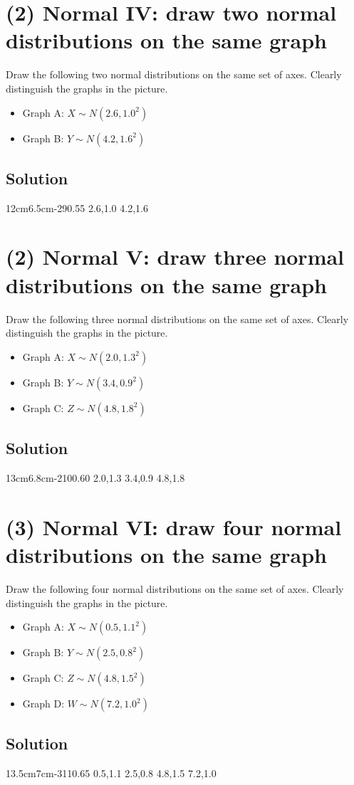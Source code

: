 \section{(2) Normal IV: draw two normal distributions on the same graph}
Draw the following two normal distributions on the same set of axes. Clearly distinguish the graphs in the picture.
\begin{itemize}
\item Graph A: $X\sim N(2.6,1.0^2)$
\item Graph B: $Y\sim N(4.2,1.6^2)$
\end{itemize}
\subsection*{Solution}
\NormalTwoGraph
{12cm}{6.5cm}{-2}{9}{0.55}
{2.6,1.0}
{4.2,1.6}

\section{(2) Normal V: draw three normal distributions on the same graph}
Draw the following three normal distributions on the same set of axes. Clearly distinguish the graphs in the picture.
\begin{itemize}
\item Graph A: $X\sim N(2.0,1.3^2)$
\item Graph B: $Y\sim N(3.4,0.9^2)$
\item Graph C: $Z\sim N(4.8,1.8^2)$
\end{itemize}
\subsection*{Solution}
\NormalThreeGraph
{13cm}{6.8cm}{-2}{10}{0.60}
{2.0,1.3}
{3.4,0.9}
{4.8,1.8}

\section{(3) Normal VI: draw four normal distributions on the same graph}
Draw the following four normal distributions on the same set of axes. Clearly distinguish the graphs in the picture.
\begin{itemize}
\item Graph A: $X\sim N(0.5,1.1^2)$
\item Graph B: $Y\sim N(2.5,0.8^2)$
\item Graph C: $Z\sim N(4.8,1.5^2)$
\item Graph D: $W\sim N(7.2,1.0^2)$
\end{itemize}
\subsection*{Solution}
\NormalFourGraph
{13.5cm}{7cm}{-3}{11}{0.65}
{0.5,1.1}
{2.5,0.8}
{4.8,1.5}
{7.2,1.0}


